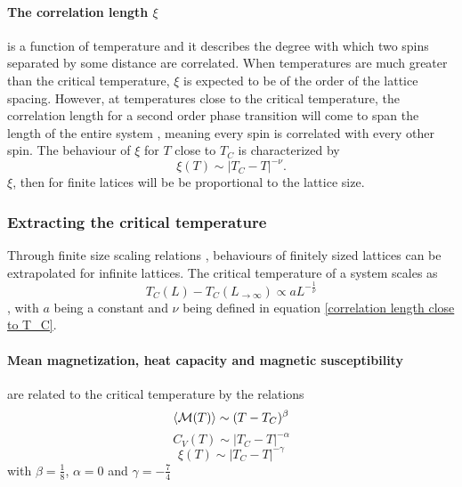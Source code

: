 \documentclass[10pt,a4paper]{article}
\begin{document}
\paragraph{The correlation length $\xi$}is a function of temperature and it describes the degree with which two spins separated by some distance are correlated. When temperatures are much greater than the critical temperature, $\xi$ is expected to be of the order of the lattice spacing. However, at temperatures close to the critical temperature, the correlation length for a second order phase transition will come to span the length of the entire system \cite{Problem_set_4}, meaning every spin is correlated with every other spin. The behaviour of $\xi$ for $T$ close to $T_C$ is characterized by
\begin{equation}\label{correlation length close to T_C}
\xi(T)\sim \left| T_C-T \right|^{-\nu}.
\end{equation}
$\xi$, then for finite latices will be be proportional to the lattice size.
\subsubsection{Extracting the critical temperature}\label{Extracting the critical temperature}
Through finite size scaling relations \cite{Problem_set_4}, behaviours of finitely sized lattices can be extrapolated for infinite lattices. The critical temperature of a system scales as
\begin{equation}\label{Critical temperature with infinity equation}
T_C(L) -T_C(L_{\rightarrow \infty}) \propto aL^{-\frac{1}{\nu}}
\end{equation}
\cite{Lecture_Notes_Fall_2015}, with $a$ being a constant and $\nu$ being defined in equation \eqref{correlation length close to T_C}.
\paragraph{Mean magnetization, heat capacity and magnetic susceptibility}are related to the critical temperature by the relations
\begin{equation}
\braket{\mathcal{M}(T)} \sim (T-T_C)^\beta
\end{equation}
\begin{equation}
C_V(T) \sim |T_C-T|^{-\alpha}
\end{equation}
\begin{equation}
\xi(T) \sim |T_C-T|^{-\gamma}
\end{equation}
with $\beta=\frac{1}{8}$, $\alpha=0$ and $\gamma = -\frac{7}{4}$ \cite{Lecture_Notes_Fall_2015}
\end{document}
